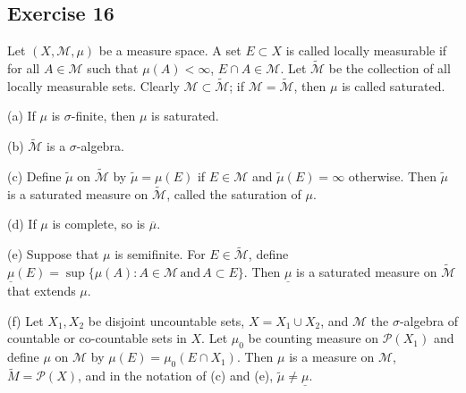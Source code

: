 \subsection*{Exercise 16}
Let $(X,\mathcal{M},\mu)$ be a measure space. A set $E\subset X$ is called locally measurable if for all $A\in\mathcal{M}$ such that $\mu(A)<\infty$, $E\cap A\in\mathcal{M}$. Let $\widetilde{\mathcal{M}}$ be the collection of all locally measurable sets. Clearly $\mathcal{M}\subset\widetilde{\mathcal{M}}$; if $\mathcal{M}=\widetilde{\mathcal{M}}$, then $\mu$ is called saturated.
\par(a) If $\mu$ is $\sigma$-finite, then $\mu$ is saturated.
\par(b) $\widetilde{\mathcal{M}}$ is a $\sigma$-algebra.
\par(c) Define $\widetilde{\mu}$ on $\widetilde{\mathcal{M}}$ by $\widetilde{\mu}=\mu(E)$ if $E\in\mathcal{M}$ and $\widetilde{\mu}(E)=\infty$ otherwise. Then $\widetilde{\mu}$ is a saturated measure on $\widetilde{\mathcal{M}}$, called the saturation of $\mu$.
\par(d) If $\mu$ is complete, so is $\overline{\mu}$.
\par(e) Suppose that $\mu$ is semifinite. For $E\in\widetilde{\mathcal{M}}$, define $\underline{\mu}(E)=\sup\{\mu(A):A\in\mathcal{M}\,\text{and}\,A\subset E\}$. Then $\underline{\mu}$ is a saturated measure on $\widetilde{\mathcal{M}}$ that extends $\mu$.
\par(f) Let $X_1, X_2$ be disjoint uncountable sets, $X=X_1\cup X_2$, and $\mathcal{M}$ the $\sigma$-algebra of countable or co-countable sets in $X$. Let $\mu_0$ be counting measure on $\mathcal{P}(X_1)$ and define $\mu$ on $\mathcal{M}$ by $\mu(E)=\mu_0(E\cap X_1)$. Then $\mu$ is a measure on $\mathcal{M}$, $\widetilde{M}=\mathcal{P}(X)$, and in the notation of (c) and (e), $\widetilde{\mu}\neq\underline{\mu}$.
